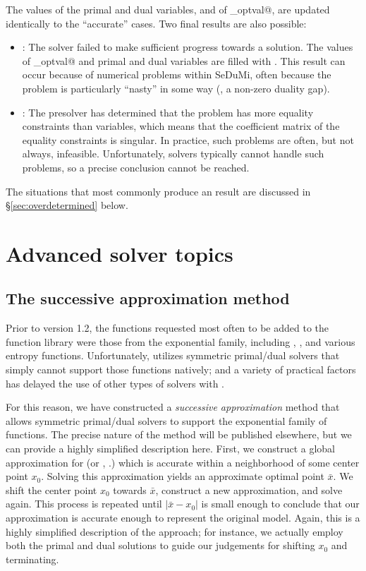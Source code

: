 \documentclass[12pt]{article}
\begin{document}
The values of the primal and dual variables, and of \verb@cvx_optval@, are updated
identically to the ``accurate'' cases. Two final results are also possible:
\begin{itemize}
	\item \verb@Failed@: The solver failed to make sufficient progress towards
	      a solution. The values of \verb@cvx_optval@ and primal and dual
	      variables are filled with \verb@NaN@s. This result can occur because
	      of numerical problems within SeDuMi, often because the problem
	      is particularly ``nasty'' in some way (\eg, a non-zero duality gap).
	\item \verb@Overdetermined@: The presolver has determined that the problem
	      has more equality constraints than variables, which means that the coefficient
	      matrix of the equality constraints is singular. In practice, such problems are
	      often, but not always, infeasible. Unfortunately, solvers 
	      typically cannot handle such problems, so a precise conclusion
	      cannot be reached.
\end{itemize}
The situations that most commonly produce an \verb@Overdetermined@ result are discussed
in \S\ref{sec:overdetermined} below.

\newpage
\section{Advanced solver topics}

\subsection{The successive approximation method}
\label{sec:succ-approx}

Prior to version 1.2, the functions requested most often to be added to the 
\cvx function library were those from the exponential family,
including \verb@exp@, \verb@log@, and various
entropy functions. Unfortunately, \cvx utilizes symmetric primal/dual solvers 
that simply cannot support those functions natively; and a variety of practical
factors has delayed the use of other types of solvers with \cvx.

For this reason, we have constructed a \emph{successive approximation} method
that allows symmetric primal/dual solvers to support the exponential family
of functions. The precise nature of the method will be published elsewhere,
but we can provide a highly simplified description here. First, 
we construct a global approximation for \verb@exp@ (or \verb@log@,
\etc.) which is accurate within a neighborhood of some center point $x_0$.
Solving this approximation yields an approximate optimal point $\bar{x}$. We
shift the center point $x_0$ towards $\bar{x}$, construct a new approximation,
and solve again. This process is repeated until $|\bar{x}-x_0|$ is small enough to conclude
that our approximation is accurate enough to represent the original model.
Again, this is a highly simplified description of the approach; for instance, 
we actually employ both the primal and dual solutions to
guide our judgements for shifting $x_0$ and terminating.
\end{document}
